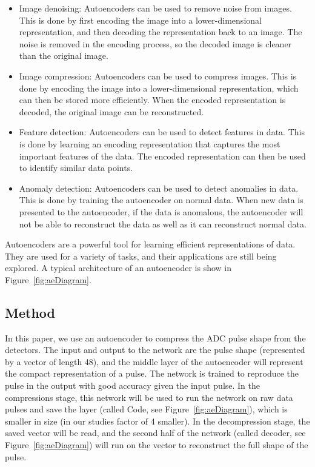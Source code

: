\begin{itemize}
\item Image denoising: Autoencoders can be used to remove noise from images. This is done by first encoding the image into a lower-dimensional representation, and then decoding the representation back to an image. The noise is removed in the encoding process, so the decoded image is cleaner than the original image.
\item  Image compression: Autoencoders can be used to compress images. This is done by encoding the image into a lower-dimensional representation, which can then be stored more efficiently. When the encoded representation is decoded, the original image can be reconstructed.
\item Feature detection: Autoencoders can be used to detect features in data. This is done by learning an encoding representation that captures the most important features of the data. The encoded representation can then be used to identify similar data points.
\item Anomaly detection: Autoencoders can be used to detect anomalies in data. This is done by training the autoencoder on normal data. When new data is presented to the autoencoder, if the data is anomalous, the autoencoder will not be able to reconstruct the data as well as it can reconstruct normal data.
\end{itemize}
Autoencoders are a powerful tool for learning efficient representations of data. They are used for a variety of tasks, and their applications are still being explored. A typical architecture of an autoencoder is show in Figure~\ref{fig:aeDiagram}.


\subsection{Method}

In this paper, we use an autoencoder to compress the ADC pulse shape from the detectors. The input and output to the network are the pulse shape (represented by a vector of length 48), and the middle layer of the autoencoder will represent the compact representation of a pulse. The network is trained to reproduce the pulse in the output with good accuracy given the input pulse. In the compressions stage, this network will be used to run the network on raw data pulses and save the layer (called Code, see Figure~\ref{fig:aeDiagram}), which is smaller in size (in our studies factor of 4 smaller).
In the decompression stage, the saved vector will be read, and the second half of the network (called decoder, see Figure~\ref{fig:aeDiagram}) will run on the vector to reconstruct the full shape of the pulse. 



